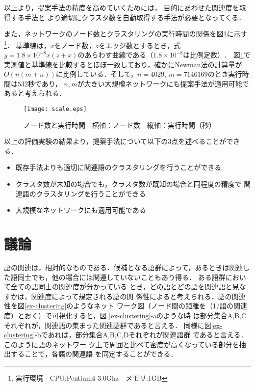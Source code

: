 \documentclass[japanese]{jnlp_1.3a}
\begin{document}
以上より，提案手法の精度を高めていくためには，
目的にあわせた関連度を取得する手法と
より適切にクラスタ数を自動取得する手法が必要となってくる．



また，ネットワークのノード数とクラスタリングの実行時間の関係を図\ref{scalable}に示す\footnote{実行環境　CPU:Pentium4 3.0Ghz　メモリ:1GB}．
基準線は，$x$をノード数，$z$をエッジ数とするとき，式$y=1.8 \times 10^{-8} x(z+x)$のあらわす曲線である（$1.8 \times 10^{-8}は比例定数）$．
図\ref{scalable}で実測値と基準線を比較するとほぼ一致しており，確かにNewman法の計算量が
$O(n(m+n))$に比例している．そして，$n=4029$, $m=7146169$のとき実行時間は$532$秒であり，
$n,m$が大きい大規模ネットワークにも提案手法が適用可能であると考えられる．


\begin{figure}[t]
 \begin{center}
  \texttt{[image: scale.eps]}
 \end{center}
 \caption{ノード数と実行時間　横軸：ノード数　縦軸：実行時間（秒）}
  \label{scalable}
\end{figure}


以上の評価実験の結果より，提案手法について以下の3点を述べることができる．
\begin{itemize}
\item 既存手法よりも適切に関連語のクラスタリングを行うことができる
\item クラスタ数が未知の場合でも，クラスタ数が既知の場合と同程度の精度で
      関連語のクラスタリングを行うことができる
\item 大規模なネットワークにも適用可能である
\end{itemize}



\section{議論}
語の関連は，相対的なものである．候補となる語群によって，あるときは関連した語同士でも，他の場合には関連していないこともあり得る．
ある語群において全ての語同士の関連度が分かっている
とき，どの語とどの語を関連語と見なすかは，関連度によって規定される語の関
係性によると考えられる．語の関連性を図\ref{ex-clustering}のようなネット
ワーク図（ノード間の距離を（1/語の関連度）とおく）で可視化すると，図
\ref{ex-clustering}-aのような時
は部分集合A,B,Cそれぞれが，関連語の集まった関連語群であると言える．
同様に図\ref{ex-clustering}-bであれば，部分集合A,B,C,Dそれぞれが関連語群
であると言える．このように語のネットワー
ク上で周囲と比べて密度が高くなっている部分を抽出することで，各語の関連語
を同定することができる．
\end{document}
